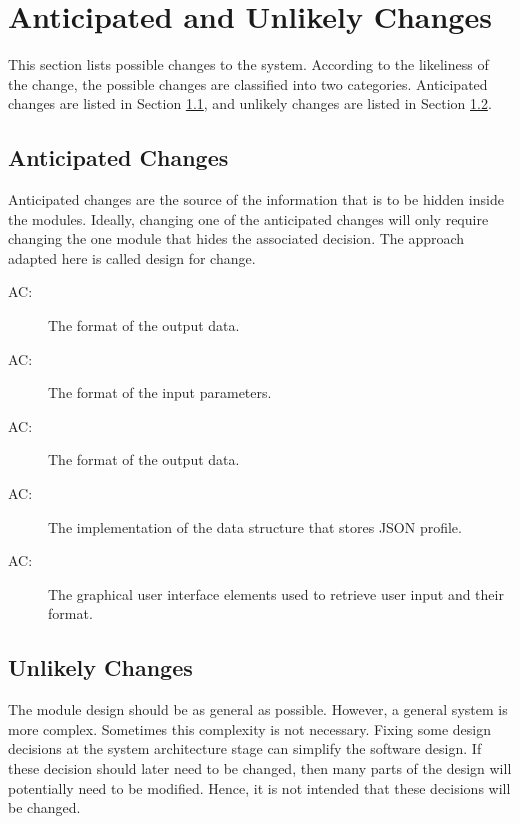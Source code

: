 \documentclass[12pt, titlepage]{article}
\newcounter{acnum}
\newcommand{\actheacnum}{AC\theacnum}
\begin{document}
\section{Anticipated and Unlikely Changes} \label{SecChange}

This section lists possible changes to the system. According to the likeliness
of the change, the possible changes are classified into two
categories. Anticipated changes are listed in Section \ref{SecAchange}, and
unlikely changes are listed in Section \ref{SecUchange}.

\subsection{Anticipated Changes} \label{SecAchange}
Anticipated changes are the source of the information that is to be hidden
inside the modules. Ideally, changing one of the anticipated changes will only
require changing the one module that hides the associated decision. The approach
adapted here is called design for
change.

\begin{description}
\item[ \actheacnum \label{acHardware}:] The format of the output data.
\item[ \actheacnum \label{acInput}:] The format of the input parameters.
\item[ \actheacnum \label{acInput}:] The format of the output data.
\item[ \actheacnum \label{acInput}:] The implementation of the data structure that stores JSON profile.
\item[ \actheacnum \label{acInput}:] The graphical user interface elements used to retrieve user input and their format.
\end{description}

\subsection{Unlikely Changes} \label{SecUchange}
The module design should be as general as possible. However, a general system is
more complex. Sometimes this complexity is not necessary. Fixing some design
decisions at the system architecture stage can simplify the software design. If
these decision should later need to be changed, then many parts of the design
will potentially need to be modified. Hence, it is not intended that these
decisions will be changed.
\end{document}
